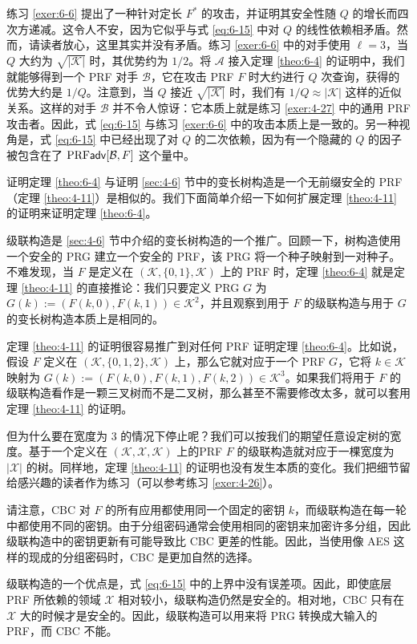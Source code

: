 练习 \ref{exer:6-6} 提出了一种针对定长 $F^*$ 的攻击，并证明其安全性随 $Q$ 的增长而四次方递减。这令人不安，因为它似乎与式 \ref{eq:6-15} 中对 $Q$ 的线性依赖相矛盾。然而，请读者放心，这里其实并没有矛盾。练习 \ref{exer:6-6} 中的对手使用 $\ell=3$，当 $Q$ 大约为 $\sqrt{|\mathcal{K}|}$ 时，其优势约为 $1/2$。将 $\mathcal{A}$ 接入定理 \ref{theo:6-4} 的证明中，我们就能够得到一个 PRF 对手 $\mathcal{B}$，它在攻击 PRF $F$ 时大约进行 $Q$ 次查询，获得的优势大约是 $1/Q$。注意到，当 $Q$ 接近 $\sqrt{|\mathcal{K}|}$ 时，我们有 $1/Q\approx|\mathcal{K}|$ 这样的近似关系。这样的对手 $\mathcal{B}$ 并不令人惊讶：它本质上就是练习 \ref{exer:4-27} 中的通用 PRF 攻击者。因此，式 \ref{eq:6-15} 与练习 \ref{exer:6-6} 中的攻击本质上是一致的。另一种视角是，式 \ref{eq:6-15} 中已经出现了对 $Q$ 的二次依赖，因为有一个隐藏的 $Q$ 的因子被包含在了 ${\rm PRF\mathsf{adv}}[\mathcal{B},F]$ 这个量中。

\vspace{5pt}

证明定理 \ref{theo:6-4} 与证明 \ref{sec:4-6} 节中的变长树构造是一个无前缀安全的 PRF（定理 \ref{theo:4-11}）是相似的。我们下面简单介绍一下如何扩展定理 \ref{theo:4-11} 的证明来证明定理 \ref{theo:6-4}。

\begin{snote}[与树构造的关系。]
级联构造是 \ref{sec:4-6} 节中介绍的变长树构造的一个推广。回顾一下，树构造使用一个安全的 PRG 建立一个安全的 PRF，该 PRG 将一个种子映射到一对种子。不难发现，当 $F$ 是定义在 $(\mathcal{K},\{0,1\},\mathcal{K})$ 上的 PRF 时，定理 \ref{theo:6-4} 就是定理 \ref{theo:4-11} 的直接推论：我们只要定义 PRG $G$ 为 $G(k):=(F(k,0),F(k,1))\in\mathcal{K}^2$，并且观察到用于 $F$ 的级联构造与用于 $G$ 的变长树构造本质上是相同的。

定理 \ref{theo:4-11} 的证明很容易推广到对任何 PRF 证明定理 \ref{theo:6-4}。比如说，假设 $F$ 定义在 $(\mathcal{K},\{0,1,2\},\mathcal{K})$ 上，那么它就对应于一个 PRF $G$，它将 $k\in\mathcal{K}$ 映射为 $G(k):=(F(k,0),F(k,1),F(k,2))\in\mathcal{K}^3$。如果我们将用于 $F$ 的级联构造看作是一颗三叉树而不是二叉树，那么甚至不需要修改太多，就可以套用定理 \ref{theo:4-11} 的证明。

但为什么要在宽度为 $3$ 的情况下停止呢？我们可以按我们的期望任意设定树的宽度。基于一个定义在 $(\mathcal{K},\mathcal{X},\mathcal{K})$ 上的PRF $F$ 的级联构造就对应于一棵宽度为 $|\mathcal{X}|$ 的树。同样地，定理 \ref{theo:4-11} 的证明也没有发生本质的变化。我们把细节留给感兴趣的读者作为练习（可以参考练习 \ref{exer:4-26}）。
\end{snote}

\begin{snote}
请注意，CBC 对 $F$ 的所有应用都使用同一个固定的密钥 $k$，而级联构造在每一轮中都使用不同的密钥。由于分组密码通常会使用相同的密钥来加密许多分组，因此级联构造中的密钥更新有可能导致比 CBC 更差的性能。因此，当使用像 AES 这样的现成的分组密码时，CBC 是更加自然的选择。

级联构造的一个优点是，式 \ref{eq:6-15} 中的上界中没有误差项。因此，即使底层 PRF 所依赖的领域 $\mathcal{X}$ 相对较小，级联构造仍然是安全的。相对地，CBC 只有在 $\mathcal{X}$ 大的时候才是安全的。因此，级联构造可以用来将 PRG 转换成大输入的 PRF，而 CBC 不能。
\end{snote}

